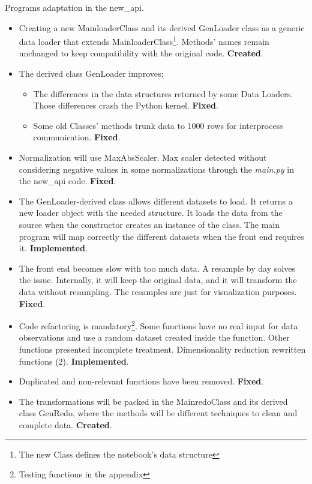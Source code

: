 \documentclass[a4paper]{article}
\begin{document}
Programs adaptation in the new\_api.

\begin{itemize}
\item Creating a new MainloaderClass and its derived GenLoader class as a generic data loader that extends MainloaderClass\footnote{The new Class defines the notebook's data structure}. Methods' names remain unchanged to keep compatibility with the original code. \textbf{Created}.
\end{itemize}

\large
\begin{center}

\end{center}
\normalsize

\begin{itemize}
\item The derived class GenLoader improves:

\begin{itemize}
\item The differences in the data structures returned by some Data Loaders. Those differences crash the Python kernel. \textbf{Fixed}.

\item Some old Classes' methods trunk data to 1000 rows for interprocess communication. \textbf{Fixed}.
\end{itemize}

\item Normalization will use MaxAbsScaler. Max scaler detected without considering negative values in some normalizations through the \emph{main.py} in the new\_api code. \textbf{Fixed}.

\item The GenLoader-derived class allows different datasets to load. It returns a new loader object with the needed structure. It loads the data from the source when the constructor creates an instance of the class. The main program will map correctly the different datasets when the front end requires it. \textbf{Implemented}.

\item The front end becomes slow with too much data. A resample by day solves the issue. Internally, it will keep the original data, and it will transform the data without resampling. The resamples are just for visualization purposes. \textbf{Fixed}.

\item Code refactoring is mandatory\footnote{Testing functions in the appendix}. Some functions have no real input for data observations and use a random dataset created inside the function. Other functions presented incomplete treatment. Dimensionality reduction rewritten functions (2). \textbf{Implemented}.

\item Duplicated and non-relevant functions have been removed. \textbf{Fixed}.

\item The transformations will be packed in the MainredoClass and its derived class GenRedo, where the methods will be different techniques to clean and complete data. \textbf{Created}.
\end{itemize}
\end{document}
